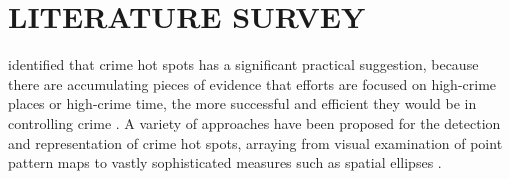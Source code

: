 \chapter{LITERATURE SURVEY} \vspace{-15 mm} \hrulefill
\label{Chapter:2}

\noindent
 \citet{Ansar2003} identified that  crime hot spots has a significant practical suggestion, because there are accumulating pieces of evidence that  efforts are focused on high-crime places or high-crime time, the more successful and efficient they would be in controlling crime . A variety of approaches have been proposed for the detection and representation of crime hot spots, arraying from visual examination of point pattern maps to vastly sophisticated measures such as spatial ellipses \cite{Ansar2003}.

